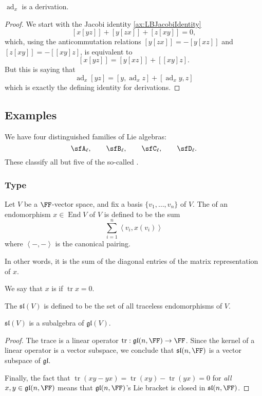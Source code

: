 \documentclass{article}
\newcommand{\ip}[1]{\ensuremath{\left\langle{#1}\right\rangle}}
\newcommand{\lb}[1]{\ensuremath{\left[{#1}\right]}}
\DeclareMathOperator{\End}{End}
\DeclareMathOperator{\tr}{tr}
\DeclareMathOperator{\ad}{ad}
\newcommand{\glalg}{\ensuremath{\mathfrak{gl}}}
\newcommand{\slalg}{\ensuremath{\mathfrak{sl}}}
\begin{document}
\begin{proposition}
    $\ad_x$ is a derivation.
\end{proposition}
\begin{proof}
    We start with the Jacobi identity \ref{ax:LBJacobiIdentity}
    \[
        \lb{x\lb{yz}} + \lb{y\lb{zx}} + \lb{z\lb{xy}}
        =
        0,
    \]
    which, using the anticommutation relations $\lb{y\lb{zx}} = -\lb{y\lb{xz}}$ and $\lb{z\lb{xy}} = -\lb{\lb{xy}z}$, is equivalent to
    \[
        \lb{x\lb{yz}}
        =
        \lb{y\lb{xz}} + \lb{\lb{xy}{z}}.
    \]
    But this is saying that
    \[
        \ad_x\lb{yz}
        =
        \lb{y, \ad_x z}
        +
        \lb{\ad_xy, z}
    \]
    which is exactly the defining identity for derivations.
\end{proof}


\subsection{Examples}

We have four distinguished families of Lie algebras:
\[
    \sfA_\ell,\qquad
    \sfB_\ell,\qquad
    \sfC_\ell,\qquad
    \sfD_\ell.
\]
These classify all but five of the so-called .


\subsubsection{Type \sfA}

\begin{definition}
    Let $V$ be a $\FF$-vector space, and fix a basis $\{v_1,\ldots,v_n\}$ of $V$.
    The  of an endomorphism $x \in \End V$ of $V$ is defined to be the sum
    \[
        \sum_{i=1}^n\ip{v_i,x(v_i)}
    \]
    where $\ip{-,-}$ is the canonical pairing.

    In other words, it is the sum of the diagonal entries of the matrix representation of $x$.

    We say that $x$ is  if $\tr x = 0$.
\end{definition}

\begin{definition}
    The  $\slalg(V)$ is defined to be the set of all traceless endomorphisms of $V$.
\end{definition}

\begin{proposition}
    $\slalg(V)$ is a subalgebra of $\glalg(V)$.
\end{proposition}
\begin{proof}
    The trace is a linear operator $\tr: \glalg(n, \FF) \to \FF$.
    Since the kernel of a linear operator is a vector subspace, we conclude that $\slalg(n, \FF)$ is a vector subspace of $\glalg$.

    Finally, the fact that $\tr(xy - yx) = \tr(xy) - \tr(yx) = 0$ for \textit{all} $x,y \in \glalg(n,\FF)$ means that $\glalg(n,\FF)$'s Lie bracket is closed in $\slalg(n,\FF)$.
\end{proof}
\end{document}
